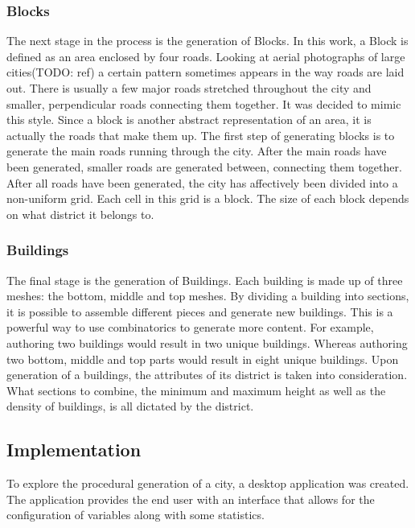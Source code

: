 		\subsubsection{Blocks}
		The next stage in the process is the generation of Blocks. In this work, a Block is defined as an area enclosed by four roads. Looking at aerial photographs of large cities(TODO: ref) a certain pattern sometimes appears in the way roads are laid out. There is usually a few major roads stretched throughout the city and smaller, perpendicular roads connecting them together. It was decided to mimic this style. Since a block is another abstract representation of an area, it is actually the roads that make them up. The first step of generating blocks is to generate the main roads running through the city. After the main roads have been generated, smaller roads are generated between, connecting them together. After all roads have been generated, the city has affectively been divided into a non-uniform grid. Each cell in this grid is a block. The size of each block depends on what district it belongs to.
		
		\subsubsection{Buildings}
		The final stage is the generation of Buildings. Each building is made up of three meshes: the bottom, middle and top meshes. By dividing a building into sections, it is possible to assemble different pieces and generate new buildings. This is a powerful way to use combinatorics to generate more content. For example, authoring two buildings would result in two unique buildings. Whereas authoring two bottom, middle and top parts would result in eight unique buildings. Upon generation of a buildings, the attributes of its district is taken into consideration. What sections to combine, the minimum and maximum height as well as the density of buildings, is all dictated by the district.

	\subsection{Implementation}
	To explore the procedural generation of a city, a desktop application was created. The application provides the end user with an interface that allows for the configuration of variables along with some statistics. 
	
